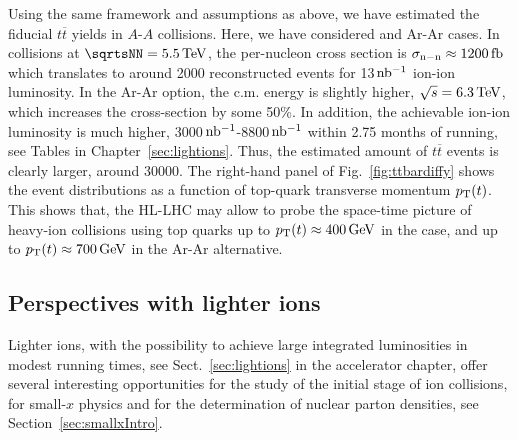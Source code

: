 \documentclass[../report.tex]{subfiles}
\begin{document}
Using the same framework and assumptions as above, we have estimated the fiducial $t\overline{t}$ yields in $A$-$A$ collisions. Here, we have considered \PbPb and Ar-Ar cases. In \PbPb collisions at $\sqrtsNN = 5.5 \, {\rm TeV}$, the per-nucleon cross section is $\sigma_{\rm n-n} \approx 1200 \, {\rm fb}$ which translates to around 2000 reconstructed events for 13$\, \rm nb^{-1}$ ion-ion luminosity. In the Ar-Ar option, the c.m. energy is slightly higher, $\sqrt{s} = 6.3 \, {\rm TeV}$, which increases the cross-section by some 50\%. In addition, the achievable ion-ion luminosity is much higher, 3000$\,\rm nb^{-1}$-8800$\,\rm nb^{-1}$ within 2.75 months of running, see Tables in Chapter~\ref{sec:lightions}. %
Thus, the estimated amount of $t\overline{t}$ events is clearly larger, around 30000. The right-hand panel of Fig.~\ref{fig:ttbardiffy} shows the event distributions as a function of top-quark transverse momentum $p\sb{\scriptstyle\mathrm{T}}(t)$. This shows that, the HL-LHC may allow to probe the space-time picture of heavy-ion collisions using top quarks \cite{Apolinario:2017sob} up to $p_{\rm T}(t) \approx 400\,{\rm GeV}$ in the \PbPb case, and up to $p_{\rm T}(t) \approx 700\,{\rm GeV}$ in the Ar-Ar alternative. 





\subsection{Perspectives with lighter ions}
\label{sec:nPDF_lightions}

Lighter ions, with the possibility to achieve large integrated luminosities in modest running times, see Sect.~\ref{sec:lightions} in the accelerator chapter, offer several interesting opportunities for the study of the initial stage of ion collisions, for small-$x$ physics and for the determination of nuclear parton densities, see Section~\ref{sec:smallxIntro}.
\end{document}

